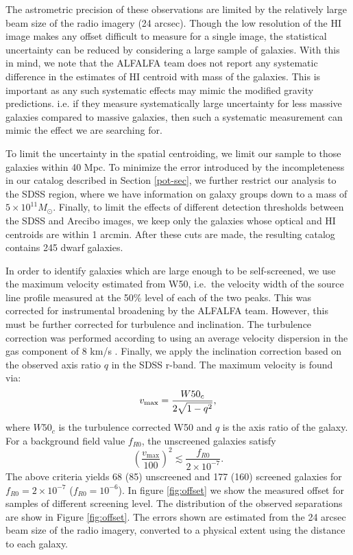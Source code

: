 \documentclass[useAMS,usenatbib,twocolumn]{mn2e}
\begin{document}
The astrometric precision of these observations are limited by the
relatively large beam size of the radio imagery (24 arcsec).
Though the low resolution of the HI image makes any offset difficult to
measure for a single image,
the statistical uncertainty can be reduced by considering a large sample of
galaxies. With this in mind, we note that the ALFALFA team
does not report any systematic difference in the estimates of HI centroid with
mass of the galaxies.
This is important as any such systematic effects
may mimic the modified gravity predictions. i.e.  if they measure systematically
large uncertainty for less massive galaxies compared to massive galaxies, then
such a systematic measurement can mimic the effect we are searching for.

To limit the  uncertainty in the spatial centroiding,
we limit our sample to those galaxies within 40 Mpc.
To minimize the error introduced by the incompleteness in our catalog described
in Section \ref{pot-sec}, we further  restrict our analysis to the SDSS region,
where  we have information on galaxy groups down to a mass of
$5\times 10^{11}M_\odot$.  Finally, to limit the
effects of different detection thresholds between the SDSS and Arecibo
images, we keep only the galaxies whose optical and HI centroids are
within 1 arcmin.  After these cuts are made, the resulting catalog
contains 245 dwarf galaxies.


In order to identify galaxies which are large enough to be self-screened,
we use the maximum velocity estimated from W50, i.e.\ the
velocity width of the source
line profile measured at the 50\% level of each of the two peaks. This was
corrected for instrumental broadening by the ALFALFA team. However, this must
be further corrected for turbulence and inclination.
The turbulence correction was performed according to \citet{tully85} using an
average velocity dispersion in the gas component of 8 km/s \citep{begum06,
geha06}. Finally, we apply the inclination correction based on the observed
axis ratio $q$ in the SDSS r-band. The maximum velocity is found via:
\begin{equation}
  v_{\rm max} = \frac{W50_c}{2 \sqrt{1 - q^2}},
\end{equation}
where $W50_c$ is the turbulence corrected W50 and $q$ is the axis ratio of
the galaxy. For a background field value $f_{R0}$, the unscreened galaxies
satisfy  \citep[see][]{jainvinu2012}
\begin{equation}
  \left(\frac{v_{\mathrm{max}}}{100}\right)^2 \lesssim
  \frac{f_{R0}}{2\times10^{-7}}.
\label{eq:unscreened}
\end{equation}
The above criteria yields 68 (85) unscreened and 177 (160) screened galaxies
for $f_{R0} = 2 \times10^{-7}$ ($f_{R0} = 10^{-6}$). In figure \ref{fig:offset}
we show the measured offset for samples of different screening level.
The distribution of the observed separations are show in Figure
\ref{fig:offset}.  The errors shown are estimated from the 24 arcsec beam
size of the radio imagery, converted to a physical extent using the
distance to each galaxy.
\end{document}
